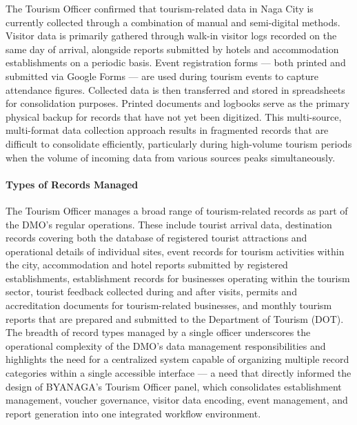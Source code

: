 \documentclass{research}
\begin{document}
The Tourism Officer confirmed that tourism-related data in Naga City is
currently collected through a combination of manual and semi-digital methods.
Visitor data is primarily gathered through walk-in visitor logs recorded on the
same day of arrival, alongside reports submitted by hotels and accommodation
establishments on a periodic basis. Event registration forms --- both printed
and submitted via Google Forms --- are used during tourism events to capture
attendance figures. Collected data is then transferred and stored in spreadsheets
for consolidation purposes. Printed documents and logbooks serve as the primary
physical backup for records that have not yet been digitized. This multi-source,
multi-format data collection approach results in fragmented records that are
difficult to consolidate efficiently, particularly during high-volume tourism
periods when the volume of incoming data from various sources peaks
simultaneously.


\paragraph{Types of Records Managed}

The Tourism Officer manages a broad range of tourism-related records as part
of the DMO's regular operations. These include tourist arrival data, destination
records covering both the database of registered tourist attractions and
operational details of individual sites, event records for tourism activities
within the city, accommodation and hotel reports submitted by registered
establishments, establishment records for businesses operating within the
tourism sector, tourist feedback collected during and after visits, permits
and accreditation documents for tourism-related businesses, and monthly tourism
reports that are prepared and submitted to the Department of Tourism (DOT). The
breadth of record types managed by a single officer underscores the operational
complexity of the DMO's data management responsibilities and highlights the
need for a centralized system capable of organizing multiple record categories
within a single accessible interface --- a need that directly informed the
design of BYANAGA's Tourism Officer panel, which consolidates establishment
management, voucher governance, visitor data encoding, event management, and
report generation into one integrated workflow environment.
\end{document}
